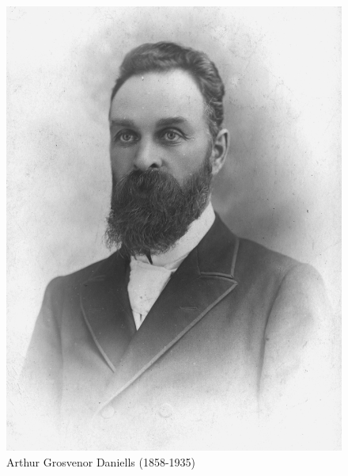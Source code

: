 \begin{figure}[hp]
    \centering
    \includegraphics[width=1\linewidth]{images/daniels.jpg}
    \caption*{Arthur Grosvenor Daniells (1858-1935)}
    \label{fig:daniells}
\end{figure}

